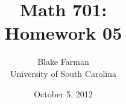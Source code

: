 \documentclass[10pt]{amsart}
\author{Blake Farman\\University of South Carolina}
\title{Math 701:\\Homework 05}
\date{October 5, 2012}
\begin{document}
\maketitle

\newcommand{\Inn}[1]{\operatorname{Inn}\left(#1\right)}
\newcommand{\Aut}[1]{\operatorname{Aut}\left(#1\right)}
\newcommand{\cntr}[1]{\mathbf{Z}\left(#1\right)}
\newcommand{\abs}[1]{\left| #1 \right|}
\newcommand{\SL}[2]{\operatorname{SL}_#1\left(#2\right)}
\newcommand{\Mat}[2]{\operatorname{Mat}_{#1}\left(#2\right)}
\newcommand{\orbit}[1]{\mathcal{O}_{#1}}
\newcommand{\real}[1]{\operatorname{\mathfrak{Re}}\left(#1\right)}
\newcommand{\imag}[1]{\operatorname{\mathfrak{Im}}\left(#1\right)}
\newcommand{\uhp}{\mathfrak{h}}
\newcommand{\Syl}[2]{\operatorname{Syl}_{#1}\left(#2\right)}

\renewcommand{\qedsymbol}{\ensuremath{\blacksquare}}

\newtheorem{thm}{}
\newtheorem{lem}{Lemma}
\end{document}

